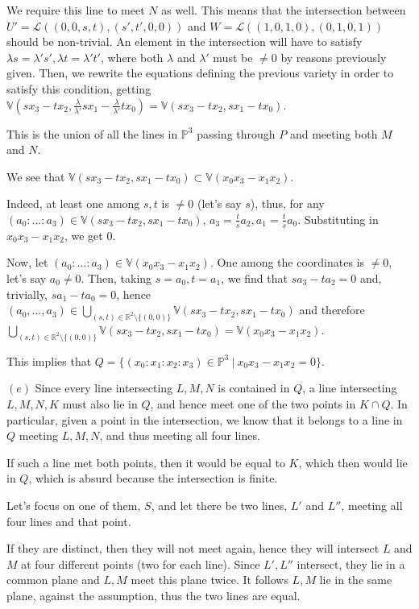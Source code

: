 \documentclass{article}
\newcommand{\numberset}{\mathbb}
\newcommand{\R}{\numberset{R}}
\newcommand{\V}{\mathbb{V}}
\newcommand{\Ps}{\mathbb{P}}
\begin{document}
We require this line to meet $N$ as well. This means that the intersection between $U'=\mathcal{L}((0,0,s,t),(s',t',0,0))$ and $W=\mathcal{L}((1,0,1,0),(0,1,0,1))$ should be non-trivial. An element in the intersection will have to satisfy $\lambda s=\lambda' s',\lambda t=\lambda't'$, where both $\lambda$ and $\lambda'$ must be $\neq 0$ by reasons previously given. Then, we rewrite the equations defining the previous variety in order to satisfy this condition, getting $\V(sx_3-tx_2,\frac{\lambda}{\lambda'}sx_1-\frac{\lambda}{\lambda'}tx_0)=\V(sx_3-tx_2,sx_1-tx_0)$.

This is the union of all the lines in $\Ps^3$ passing through $P$ and meeting both $M$ and $N$.

We see that $\V(sx_3-tx_2,sx_1-tx_0)\subset\V(x_0x_3-x_1x_2)$.

Indeed, at least one among $s,t$ is $\neq 0$ (let's say $s$), thus, for any $(a_0:\ldots:a_3)\in\V(sx_3-tx_2,sx_1-tx_0)$, $a_3=\frac{t}{s}a_2,a_1=\frac{t}{s}a_0$. Substituting in $x_0x_3-x_1x_2$, we get 0.

Now, let $(a_0:\ldots:a_3)\in\V(x_0x_3-x_1x_2)$. One among the coordinates is $\neq 0$, let's say $a_0\neq 0$. Then, taking $s=a_0,t=a_1$, we find that $sa_3-ta_2=0$ and, trivially, $sa_1-ta_0=0$, hence $(a_0,\ldots,a_3)\in\bigcup_{(s,t)\in\R^2\setminus\{(0,0)\}}\V(sx_3-tx_2,sx_1-tx_0)$ and therefore $\bigcup_{(s,t)\in\R^2\setminus\{(0,0)\}} \V(sx_3-tx_2,sx_1-tx_0)=\V(x_0x_3-x_1x_2)$.

This implies that $Q=\{(x_0:x_1:x_2:x_3)\in\Ps^3\ |\ x_0x_3-x_1x_2=0\}$.

$(e)$ Since every line intersecting $L,M,N$ is contained in $Q$, a line intersecting $L,M,N,K$ must also lie in $Q$, and hence meet one of the two points in $K\cap Q$. In particular, given a point in the intersection, we know that it belongs to a line in $Q$ meeting $L,M,N$, and thus meeting all four lines.

If such a line met both points, then it would be equal to $K$, which then would lie in $Q$, which is absurd because the intersection is finite.

Let's focus on one of them, $S$, and let there be two lines, $L'$ and $L''$, meeting all four lines and that point.

If they are distinct, then they will not meet again, hence they will intersect $L$ and $M$ at four different points (two for each line). Since $L',L''$ intersect, they lie in a common plane and $L,M$ meet this plane twice. It follows $L,M$ lie in the same plane, against the assumption, thus the two lines are equal.
\end{document}
